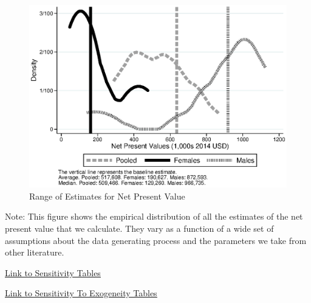 \documentclass[static]{JJH-Beamer}
\begin{document}
\begin{frame}

\begin{figure}[H]
\caption{Range of Estimates for Net Present Value}
\begin{center}
\includegraphics[width=.7\columnwidth]{output/overalldist_npv.eps}
\end{center}
\end{figure}
{\flushleft \scriptsize Note: This figure shows the empirical distribution of all the estimates of the net present value that we calculate. They vary as a function of a wide set of assumptions about the data generating process and the parameters we take from other literature.\\}

\end{frame}

\begin{frame}
\hypertarget{ret:sense}{}

\begin{center}
\hyperlink{sense}{\underline{Link to Sensitivity Tables}}
\end{center}

\end{frame}

\begin{frame}
\hypertarget{ret:netpresent}{}

\begin{center}
\hyperlink{netpresent}{\underline{Link to Sensitivity To Exogeneity Tables}}
\end{center}

\end{frame}
\end{document}
